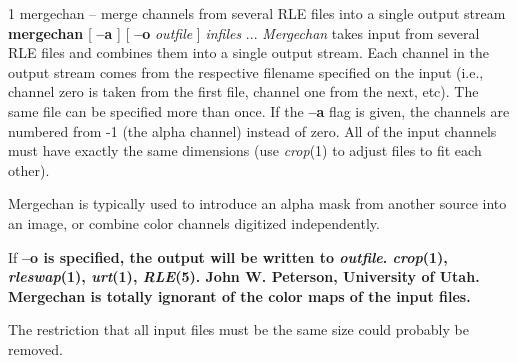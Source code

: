 %
%
%
 1
mergechan -- merge channels from several RLE files into a single output stream
{\bf mergechan}
[
{\bf --a}
] [
{\bf --o}
{\it outfile}
] 
{\it infiles} ...
{\it Mergechan}
takes input from several RLE files and combines them into a single output
stream.  Each channel in the output stream comes from the respective filename
specified on the input (i.e., channel zero is taken from the first file,
channel one from the next, etc).  The same file can be specified more than
once.  If the 
{\bf --a}
flag is given, the channels are numbered from -1 (the alpha channel) instead
of zero.  All of the input channels must have exactly the same dimensions
(use
{\it crop}{\rm (1)}
to adjust files to fit each other).

Mergechan is typically used to introduce an alpha mask from another source
into an image, or combine color channels digitized independently.

If %
\bf --o \rm%
is specified, the output will be written to
{\it outfile}{\rm .}
{\it crop}{\rm (1),}
{\it rleswap}{\rm (1),}
{\it urt}{\rm (1),}
{\it RLE}{\rm (5).}
John W. Peterson, University of Utah.
Mergechan is totally ignorant of the color maps of the input files.

The restriction that all input files must be the same size could probably
be removed.
\newpage


